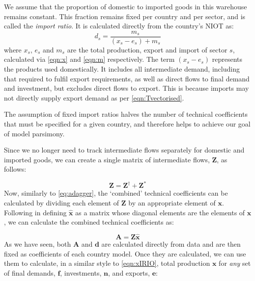 \documentclass{article}
\begin{document}
We assume that the proportion of domestic to imported goods in this warehouse remains constant.
This fraction remains fixed per country and per sector, and is called the \textit{import ratio}. It is calculated directly from the country's NIOT as:
\begin{equation}\label{eqn:importratio}
d_s = \frac{m_s}{(x_s - e_s ) + m_s}
\end{equation}
where $x_s$, $e_s$ and $m_s$ are the total production, export and import of sector $s$, calculated via \cref{eqn:x} and \cref{eqn:m} respectively.
The term $(x_s - e_s )$ represents the products used domestically.
It includes all intermediate demand, including that required to fulfil export requirements, as well as direct flows to final demand and investment, but excludes direct flows to export.
This is because imports may not directly supply export demand as per \cref{eqn:Tvectorised}.

The assumption of fixed import ratios halves the number of technical coefficients that must be specified for a given country, and therefore helps to achieve our goal of model parsimony.

Since we no longer need to track intermediate flows separately for domestic and imported goods, we can create a single matrix of intermediate flows, $\boldsymbol{Z}$, as follows:

\begin{equation}
    \boldsymbol{Z} = \boldsymbol{Z}^{\dagger} + \boldsymbol{Z}^{*}
\end{equation}
Now, similarly to \cref{eq:adagger}, the `combined' technical coefficients can be calculated by dividing each element of $\boldsymbol{Z}$ by an appropriate element of $\boldsymbol{x}$.
Following \textcite{miller_input-output_1985} in defining $\boldsymbol{\hat{x}}$ as a matrix whose diagonal elements are the elements of $\boldsymbol{x}$, we can calculate the combined technical coefficients as:

\begin{equation}\label{eqn:a_combined}
    \boldsymbol{A} = \boldsymbol{Z} \boldsymbol{\hat{x}}
\end{equation}
As we have seen, both $\boldsymbol{A}$ and $\boldsymbol{d}$ are calculated directly from data and are then fixed as coefficients of each country model. Once they are calculated, we can use them to calculate, in a similar style to \cref{eqn:xIRIO}, total production $\boldsymbol{x}$ for \textit{any} set of final demands, $\boldsymbol{f}$, investments, $\boldsymbol{n}$, and exports, $\boldsymbol{e}$: 
\end{document}
